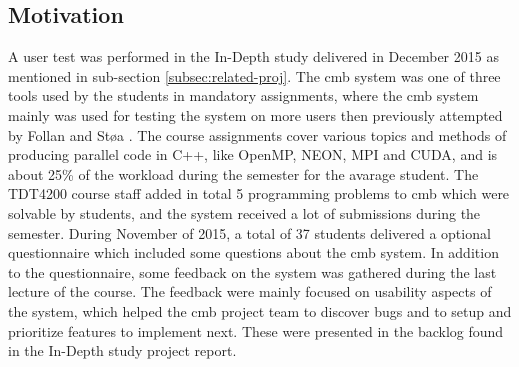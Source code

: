 \subsection{Motivation}
A user test was performed in the In-Depth study delivered in December 2015 as mentioned in sub-section \ref{subsec:related-proj}. The \gls{cmb} system was one of three tools used by the students in mandatory assignments, where the \gls{cmb} system mainly was used for testing the system on more users then previously attempted by Follan and Støa \cite{mt:T&S}. The course assignments cover various topics and methods of producing parallel code in C++, like OpenMP, NEON, MPI and CUDA, and is about 25\% of the workload during the semester for the avarage student. The TDT4200 course staff added in total 5 programming problems to \gls{cmb} which were solvable by students, and the system received a lot of submissions during the semester. During November of 2015, a total of 37 students delivered a optional questionnaire which included some questions about the \gls{cmb} system. In addition to the questionnaire, some feedback on the system was gathered during the last lecture of the course. The feedback were mainly focused on usability aspects of the system, which helped the \gls{cmb} project team to discover bugs and to setup and prioritize features to implement next. These were presented in the backlog found in the In-Depth study project report. \\

